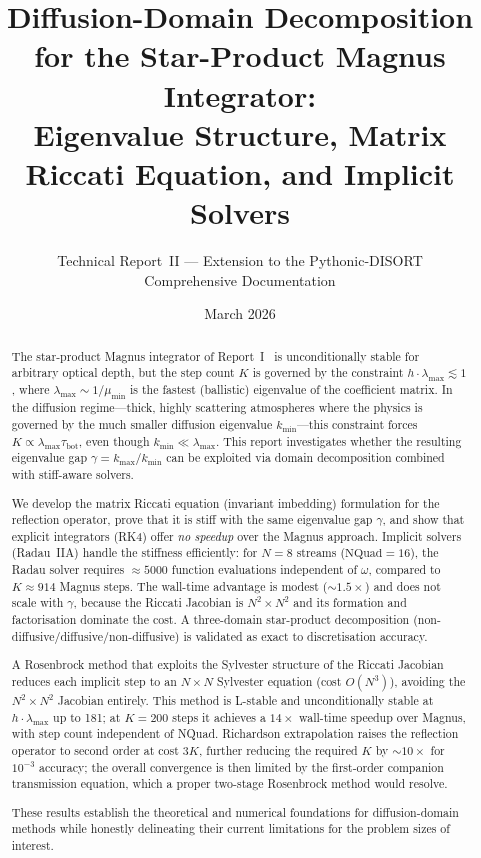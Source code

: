 \documentclass[11pt,a4paper]{article}
\title{Diffusion-Domain Decomposition for the Star-Product Magnus Integrator:\\
Eigenvalue Structure, Matrix Riccati Equation, and Implicit Solvers}
\author{Technical Report~II --- Extension to the Pythonic-DISORT\\
Comprehensive Documentation}
\date{March 2026}
\newcommand{\tbot}{\tau_{\mathrm{bot}}}
\newcommand{\kmax}{k_{\max}}
\newcommand{\kmin}{k_{\min}}
\theoremstyle{definition}
\begin{document}
\maketitle

\begin{abstract}
The star-product Magnus integrator of Report~I~\cite{report1} is
unconditionally stable for arbitrary optical depth, but the step
count $K$ is governed by the constraint $h\cdot\lambda_{\max}\lesssim 1$,
where $\lambda_{\max}\sim 1/\mu_{\min}$ is the fastest (ballistic)
eigenvalue of the coefficient matrix.  In the diffusion regime---thick,
highly scattering atmospheres where the physics is governed by the much
smaller diffusion eigenvalue $\kmin$---this constraint forces
$K\propto\lambda_{\max}\tbot$, even though $\kmin\ll\lambda_{\max}$.
This report investigates whether the resulting eigenvalue gap $\gamma
=\kmax/\kmin$ can be exploited via domain decomposition combined with
stiff-aware solvers.

We develop the matrix Riccati equation (invariant imbedding) formulation
for the reflection operator, prove that it is stiff with the same
eigenvalue gap $\gamma$, and show that explicit integrators (RK4) offer
\emph{no speedup} over the Magnus approach.  Implicit solvers
(Radau~IIA) handle the stiffness efficiently: for $N\!=\!8$ streams
($\text{NQuad}=16$), the Radau solver requires $\approx 5000$ function
evaluations independent of $\omega$, compared to $K\approx 914$ Magnus
steps.  The wall-time advantage is modest (${\sim}1.5\times$) and does
not scale with $\gamma$, because the Riccati Jacobian is
$N^2\!\times\!N^2$ and its formation and factorisation dominate the cost.
A three-domain star-product decomposition (non-diffusive/diffusive/non-diffusive)
is validated as exact to discretisation accuracy.

A Rosenbrock method that exploits the Sylvester structure of the
Riccati Jacobian reduces each implicit step to an $N\!\times\!N$
Sylvester equation (cost $O(N^3)$), avoiding the $N^2\!\times\!N^2$
Jacobian entirely.  This method is L-stable and unconditionally stable
at $h\cdot\lambda_{\max}$ up to 181; at $K=200$ steps it achieves a
$14\times$ wall-time speedup over Magnus, with step count independent
of NQuad.  Richardson extrapolation raises the reflection operator to
second order at cost $3K$, further reducing the required $K$ by
${\sim}10\times$ for $10^{-3}$ accuracy; the overall convergence is
then limited by the first-order companion transmission equation, which
a proper two-stage Rosenbrock method would resolve.

These results establish the theoretical and numerical foundations for
diffusion-domain methods while honestly delineating their current
limitations for the problem sizes of interest.
\end{abstract}
\end{document}
